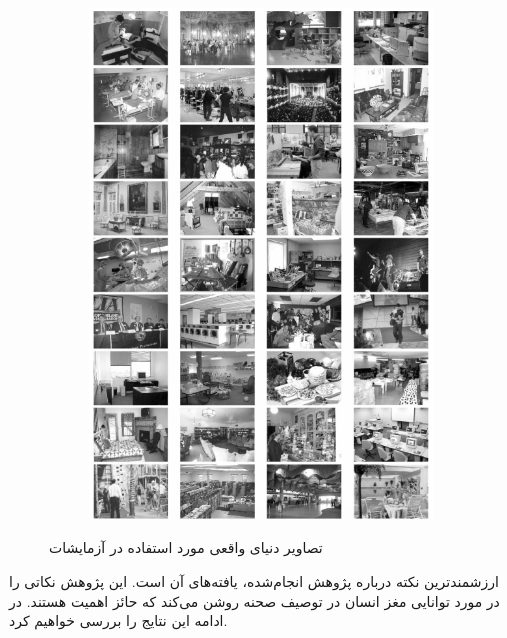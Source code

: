 \begin{figure}[h]
\begin{subfigure}[چند نمونه از تصاویر در محیط بسته]{0.4\textwidth}
		\includegraphics[scale=0.4]{Imgs/fei2007we_data2.png}
	\end{subfigure}
	\caption{تصاویر دنیای واقعی مورد استفاده در آزمایشات\cite{fei2007we}}
	\label{fig:f2007wd}
\end{figure}


ارزشمندترین نکته درباره پژوهش انجام‌شده، یافته‌های آن است. این پژوهش نکاتی را در مورد توانایی مغز انسان در توصیف صحنه روشن می‌کند که حائز اهمیت هستند. در ادامه این نتایج را بررسی خواهیم کرد.

